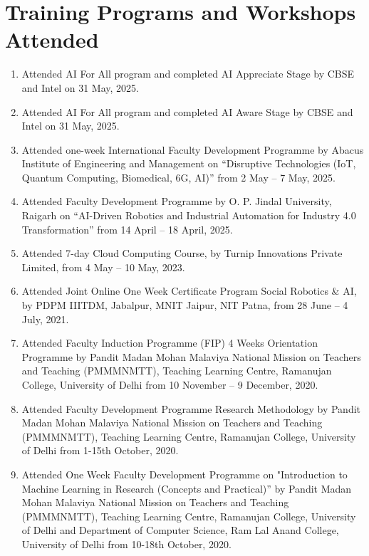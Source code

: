 \documentclass[11pt,a4paper]{moderncv}
\begin{document}
\section{\textbf{Training Programs and Workshops Attended}}

\begin{adjustwidth}{6em}{0pt}
	\begin{enumerate}
		\item Attended AI For All program and completed AI Appreciate Stage by CBSE and Intel on 31 May, 2025.
		
		\item Attended AI For All program and completed AI Aware Stage by CBSE and Intel on 31 May, 2025.
		
		\item Attended one-week International Faculty Development Programme by Abacus Institute of Engineering and Management on “Disruptive Technologies (IoT, Quantum Computing, Biomedical, 6G, AI)” from 2 May – 7 May, 2025.
		
		\item Attended Faculty Development Programme by O. P. Jindal University, Raigarh on “AI-Driven Robotics and Industrial Automation for Industry 4.0 Transformation” from 14 April – 18 April, 2025.
		
		\item Attended 7-day Cloud Computing Course, by Turnip Innovations Private Limited, from 4 May – 10 May, 2023.
		
		\item Attended Joint Online One Week Certificate Program Social Robotics \& AI, by PDPM IIITDM, Jabalpur, MNIT Jaipur, NIT Patna, from 28 June – 4 July, 2021.
		
		\item Attended Faculty Induction Programme (FIP) 4 Weeks Orientation Programme by Pandit Madan Mohan Malaviya National Mission on Teachers and Teaching (PMMMNMTT), Teaching Learning Centre, Ramanujan College, University of Delhi from 10 November – 9 December, 2020.
		
		\item Attended Faculty Development Programme Research Methodology by Pandit Madan Mohan Malaviya National Mission on Teachers and Teaching (PMMMNMTT), Teaching Learning Centre, Ramanujan College, University of Delhi from 1-15th October, 2020.
		
		\item Attended One Week Faculty Development Programme on "Introduction to Machine Learning in Research (Concepts and Practical)” by Pandit Madan Mohan Malaviya National Mission on Teachers and Teaching (PMMMNMTT), Teaching Learning Centre, Ramanujan College, University of Delhi and Department of Computer Science, Ram Lal Anand College, University of Delhi from 10-18th October, 2020.
		

\end{enumerate}
\end{adjustwidth}
\end{document}
